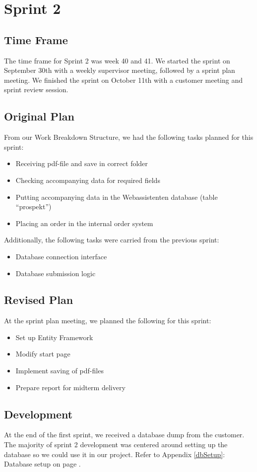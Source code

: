 \chapter{Sprint 2}

\section{Time Frame}
The time frame for Sprint 2 was week 40 and 41. We started the sprint on September 30th with a weekly supervisor meeting, followed by a sprint plan meeting. We finished the sprint on October 11th with a customer meeting and sprint review session.

\section{Original Plan}
From our Work Breakdown Structure, we had the following tasks planned for this sprint:
\begin{itemize}
	\item Receiving pdf-file and save in correct folder
	\item Checking accompanying data for required fields
	\item Putting accompanying data in the Webassistenten database (table “prospekt”)
	\item Placing an order in the internal order system
\end{itemize}

Additionally, the following tasks were carried from the previous sprint:
\begin{itemize}
	\item Database connection interface
	\item Database submission logic
\end{itemize}

\section{Revised Plan}
At the sprint plan meeting, we planned the following for this sprint:
\begin{itemize}
	\item Set up Entity Framework
	\item Modify start page
	\item Implement saving of pdf-files
	\item Prepare report for midterm delivery
\end{itemize}

\section{Development}
At the end of the first sprint, we received a database dump from the customer. The majority of sprint 2 development was centered around setting up the database so we could use it in our project. Refer to Appendix \ref{dbSetup}: Database setup on page \pageref{dbSetup}.

